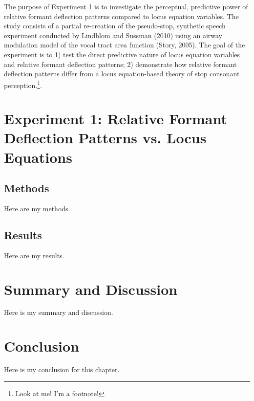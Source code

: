 \documentclass[dissertation]{uathesis}\usepackage[]{graphicx}\usepackage[]{color}
\makeatletter
\newenvironment{kframe}{%
 \def\at@end@of@kframe{}%
 \ifinner\ifhmode%
  \def\at@end@of@kframe{\end{minipage}}%
  \begin{minipage}{\columnwidth}%
 \fi\fi%
 \def\FrameCommand##1{\hskip\@totalleftmargin \hskip-\fboxsep
 \colorbox{shadecolor}{##1}\hskip-\fboxsep
     \hskip-\linewidth \hskip-\@totalleftmargin \hskip\columnwidth}%
 \MakeFramed {\advance\hsize-\width
   \@totalleftmargin\z@ \linewidth\hsize
   \@setminipage}}%
 {\par\unskip\endMakeFramed%
 \at@end@of@kframe}
\makeatother
\begin{document}
The purpose of Experiment 1 is to investigate the perceptual, predictive power of relative formant deflection patterns compared to locus equation variables. The study consists of a partial re-creation of the pseudo-stop, synthetic speech experiment conducted by Lindblom and Sussman (2010) using an airway modulation model of the vocal tract area function (Story, 2005). The goal of the experiment is to 1) test the direct predictive nature of locus equation variables and relative formant deflection patterns; 2) demonstrate how relative formant deflection patterns differ from a locus equation-based theory of stop consonant perception.\footnote{Look at me!  I'm a footnote!}.

\section{Experiment 1: Relative Formant Deflection Patterns vs. Locus Equations\label{Exp1}}
\subsection{Methods}
Here are my methods.
\subsection{Results}
Here are my results. 
\section{Summary and Discussion}
Here is my summary and discussion.
\section{Conclusion}
Here is my conclusion for this chapter.


\begin{kframe}


{\ttfamily\noindent\bfseries{}}

{\ttfamily\noindent\bfseries{}}

{\ttfamily\noindent\bfseries\color{errorcolor}{Error in ggplot(Exp1Data, aes(x = Hypothesis, y = Percent\_Participant\_Agreement, : object 'Exp1Data' not found}}\end{kframe}
\end{document}
